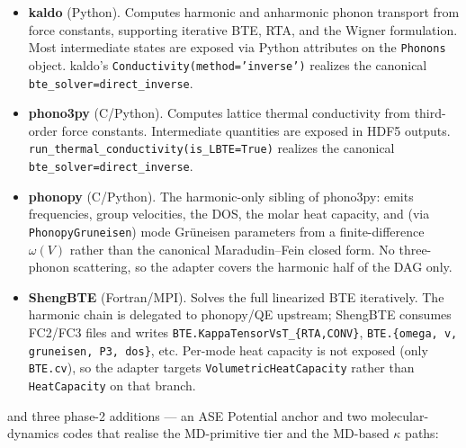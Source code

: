 \documentclass[11pt,a4paper]{article}
\begin{document}
\begin{itemize}[leftmargin=2em]
  \item \textbf{kaldo} (Python). Computes harmonic and anharmonic phonon transport from
        force constants, supporting iterative BTE, RTA, and the Wigner formulation.
        Most intermediate states are exposed via Python attributes on the
        \texttt{Phonons} object. kaldo's \texttt{Conductivity(method='inverse')}
        realizes the canonical \texttt{bte\_solver=direct\_inverse}.
  \item \textbf{phono3py} (C/Python). Computes lattice thermal conductivity from
        third-order force constants. Intermediate quantities are exposed in HDF5
        outputs. \texttt{run\_thermal\_conductivity(is\_LBTE=True)} realizes the
        canonical \texttt{bte\_solver=direct\_inverse}.
  \item \textbf{phonopy} (C/Python). The harmonic-only sibling of phono3py:
        emits frequencies, group velocities, the DOS, the molar heat capacity,
        and (via \texttt{PhonopyGruneisen}) mode Grüneisen parameters from a
        finite-difference $\omega(V)$ rather than the canonical Maradudin--Fein
        closed form. No three-phonon scattering, so the adapter covers the
        harmonic half of the DAG only.
  \item \textbf{ShengBTE} (Fortran/MPI). Solves the full linearized BTE
        iteratively. The harmonic chain is delegated to phonopy/QE upstream;
        ShengBTE consumes FC2/FC3 files and writes
        \texttt{BTE.KappaTensorVsT\_\{RTA,CONV\}}, \texttt{BTE.\{omega, v, gruneisen,
        P3, dos\}}, etc. Per-mode heat capacity is not exposed (only
        \texttt{BTE.cv}), so the adapter targets \texttt{VolumetricHeatCapacity}
        rather than \texttt{HeatCapacity} on that branch.
\end{itemize}

\noindent and three phase-2 additions --- an ASE Potential anchor and two
molecular-dynamics codes that realise the MD-primitive tier and the MD-based
$\kappa$ paths:
\end{document}
